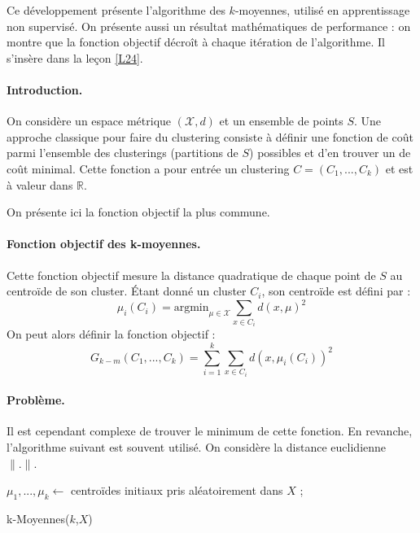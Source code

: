 


{
Ce développement présente l'algorithme des $k$-moyennes, utilisé en apprentissage non supervisé. On présente aussi un résultat mathématiques de performance : on montre que la fonction objectif décroît à chaque itération de l'algorithme. Il s'insère dans la leçon \ref{L24}.
}

\paragraph{Introduction.} On considère un espace métrique $(\mathcal{X},d)$ et un ensemble de points $S$. Une approche classique pour faire du clustering consiste à définir une fonction de coût parmi l'ensemble des clusterings (partitions de $S$) possibles et d'en trouver un de coût minimal. Cette fonction a pour entrée un clustering $C=(C_1,...,C_k)$ et est à valeur dans $\mathbb{R}$.

On présente ici la fonction objectif la plus commune.

\paragraph{Fonction objectif des k-moyennes.} Cette fonction objectif mesure la distance quadratique de chaque point de $S$ au centroïde de son cluster. Étant donné un cluster $C_i$, son centroïde est défini par :
$$
\mu_i(C_i) = \text{argmin}_{\mu \in \mathcal{X}} \sum_{x\in C_i} d(x,\mu)^2
$$
On peut alors définir la fonction objectif :
$$
G_{k-m}(C_1,...,C_k) = \sum_{i=1}^k \sum_{x\in C_i} d(x,\mu_i(C_i))^2
$$

\paragraph{Problème.} Il est cependant complexe de trouver le minimum de cette fonction. En revanche, l'algorithme suivant est souvent utilisé. On considère la distance euclidienne $\|.\|$.

\begin{algorithm}

$\mu_1,...,\mu_k \leftarrow$ centroïdes initiaux pris aléatoirement dans $X$ ;\\
\caption{k-Moyennes($k$,$X$)}
\end{algorithm}


